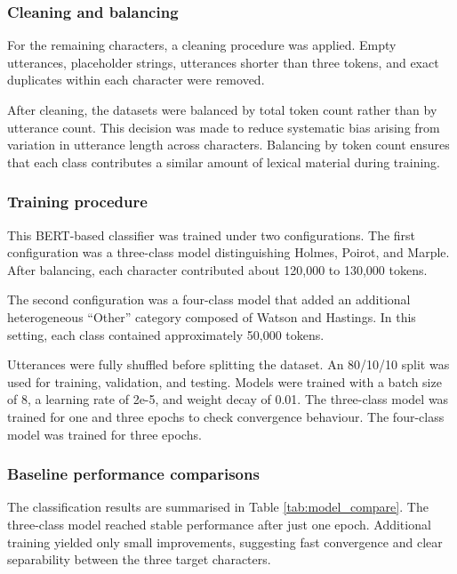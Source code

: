 \documentclass{article}
\begin{document}
\subsubsection{Cleaning and balancing} \label{sec:eval_baseline_cleaning}

For the remaining characters, a cleaning procedure was applied. Empty utterances, placeholder strings, utterances shorter than three tokens, and exact duplicates within each character were removed.

After cleaning, the datasets were balanced by total token count rather than by utterance count. This decision was made to reduce systematic bias arising from variation in utterance length across characters. Balancing by token count ensures that each class contributes a similar amount of lexical material during training.

\subsubsection{Training procedure} \label{sec:eval_baseline_training}

This BERT-based classifier was trained under two configurations. The first configuration was a three-class model distinguishing Holmes, Poirot, and Marple. After balancing, each character contributed about 120,000 to 130,000 tokens.

The second configuration was a four-class model that added an additional heterogeneous “Other” category composed of Watson and Hastings. In this setting, each class contained approximately 50,000 tokens.

Utterances were fully shuffled before splitting the dataset. An 80/10/10 split was used for training, validation, and testing. Models were trained with a batch size of 8, a learning rate of 2e-5, and weight decay of 0.01. The three-class model was trained for one and three epochs to check convergence behaviour. The four-class model was trained for three epochs.

\subsubsection{Baseline performance comparisons} \label{sec:eval_baseline_compare}

The classification results are summarised in Table \ref{tab:model_compare}. The three-class model reached stable performance after just one epoch. Additional training yielded only small improvements, suggesting fast convergence and clear separability between the three target characters.
\end{document}
